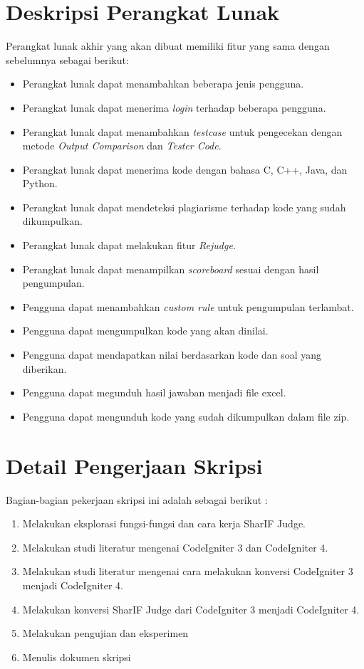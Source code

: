 \documentclass[a4paper,twoside]{article}
\begin{document}
\section{Deskripsi Perangkat Lunak}
Perangkat lunak akhir yang akan dibuat memiliki fitur yang sama dengan sebelumnya sebagai berikut:
\begin{itemize}
	\item Perangkat lunak dapat menambahkan beberapa jenis pengguna.
	\item Perangkat lunak dapat menerima \textit{login} terhadap beberapa pengguna.
	\item Perangkat lunak dapat menambahkan \textit{testcase} untuk pengecekan dengan metode \textit{Output Comparison} dan \textit{Tester Code}.
	\item Perangkat lunak dapat menerima kode dengan bahasa C, C++, Java, dan Python. 
	\item Perangkat lunak dapat mendeteksi plagiarisme terhadap kode yang sudah dikumpulkan.
	\item Perangkat lunak dapat melakukan fitur \textit{Rejudge}.
	\item Perangkat lunak dapat menampilkan \textit{scoreboard} sesuai dengan hasil pengumpulan.
	\item Pengguna dapat menambahkan \textit{custom rule} untuk pengumpulan terlambat.
	\item Pengguna dapat mengumpulkan kode yang akan dinilai.
	\item Pengguna dapat mendapatkan nilai berdasarkan kode dan soal yang diberikan.
	\item Pengguna dapat megunduh hasil jawaban menjadi file excel.
	\item Pengguna dapat mengunduh kode yang sudah dikumpulkan dalam file zip.	
\end{itemize}

\section{Detail Pengerjaan Skripsi}
Bagian-bagian pekerjaan skripsi ini adalah sebagai berikut :
	\begin{enumerate}
		\item Melakukan eksplorasi fungsi-fungsi dan cara kerja SharIF Judge. 
		\item Melakukan studi literatur mengenai CodeIgniter 3 dan CodeIgniter 4.
		\item Melakukan studi literatur mengenai cara melakukan konversi CodeIgniter 3 menjadi CodeIgniter 4.
		\item Melakukan konversi SharIF Judge dari CodeIgniter 3 menjadi CodeIgniter 4.
		\item Melakukan pengujian dan eksperimen
		\item Menulis dokumen skripsi
	\end{enumerate}
\end{document}
